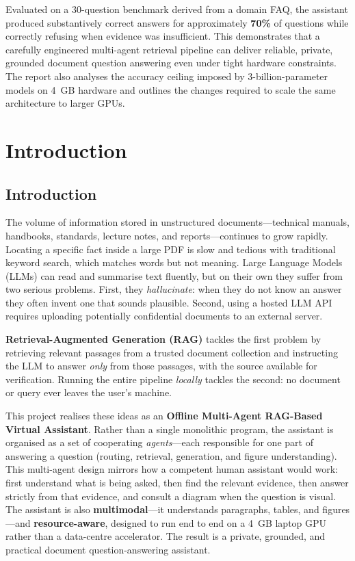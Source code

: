 \documentclass[12pt,a4paper]{report}
\begin{document}
Evaluated on a 30-question benchmark derived from a domain FAQ, the assistant
produced substantively correct answers for approximately \textbf{70\%} of
questions while correctly refusing when evidence was insufficient. This
demonstrates that a carefully engineered multi-agent retrieval pipeline can
deliver reliable, private, grounded document question answering even under tight
hardware constraints. The report also analyses the accuracy ceiling imposed by
3-billion-parameter models on 4~GB hardware and outlines the changes required to
scale the same architecture to larger GPUs.

\tableofcontents
\listoffigures
\listoftables

\clearpage
{}

\chapter{Introduction}

\section{Introduction}
The volume of information stored in unstructured documents---technical manuals,
handbooks, standards, lecture notes, and reports---continues to grow rapidly.
Locating a specific fact inside a large PDF is slow and tedious with traditional
keyword search, which matches words but not meaning. Large Language Models (LLMs)
can read and summarise text fluently, but on their own they suffer from two
serious problems. First, they \emph{hallucinate}: when they do not know an answer
they often invent one that sounds plausible. Second, using a hosted LLM API
requires uploading potentially confidential documents to an external server.

\textbf{Retrieval-Augmented Generation (RAG)} tackles the first problem by
retrieving relevant passages from a trusted document collection and instructing
the LLM to answer \emph{only} from those passages, with the source available for
verification. Running the entire pipeline \emph{locally} tackles the second: no
document or query ever leaves the user's machine.

This project realises these ideas as an \textbf{Offline Multi-Agent RAG-Based
Virtual Assistant}. Rather than a single monolithic program, the assistant is
organised as a set of cooperating \emph{agents}---each responsible for one part of
answering a question (routing, retrieval, generation, and figure understanding).
This multi-agent design mirrors how a competent human assistant would work:
first understand what is being asked, then find the relevant evidence, then answer
strictly from that evidence, and consult a diagram when the question is visual.
The assistant is also \textbf{multimodal}---it understands paragraphs, tables, and
figures---and \textbf{resource-aware}, designed to run end to end on a 4~GB laptop
GPU rather than a data-centre accelerator. The result is a private, grounded, and
practical document question-answering assistant.
\end{document}
